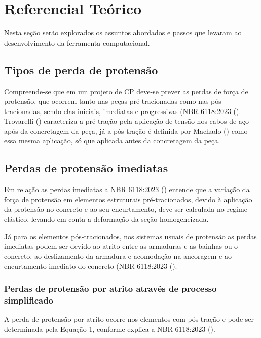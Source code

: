 \section{Referencial Teórico}

\hspace{0.4cm}Nesta seção serão explorados os assuntos abordados e passos que levaram ao desenvolvimento da ferramenta computacional.

\subsection{Tipos de perda de protensão}

\hspace{0.4cm}Compreende-se que em um projeto de CP deve-se prever as perdas de força de protensão, que ocorrem tanto nas peças pré-tracionadas como nas pós-tracionadas, sendo elas iniciais, imediatas e progressivas (NBR 6118:2023 (\citeyear{NOAB}). Trovarelli (\citeyear{TRO}) caracteriza a pré-tração pela 
aplicação de tensão nos cabos de aço após da concretagem da peça, já a pós-tração é definida por Machado (\citeyear{MAC}) como essa mesma aplicação, só que aplicada antes da concretagem da peça.

\subsection{Perdas de protensão imediatas}

\hspace{0.4cm}Em relação as perdas imediatas a NBR 6118:2023 (\citeyear{NOAB}) entende que a variação da força de protensão em elementos estruturais pré-tracionados, devido à aplicação da protensão no concreto e ao seu encurtamento, deve ser calculada no regime elástico, levando em conta a deformação da seção homogeneizada. 

Já para os elementos pós-tracionados, nos sistemas usuais de protensão as perdas imediatas podem ser devido ao atrito entre as armaduras e as bainhas ou o concreto, ao deslizamento da armadura e acomodação na ancoragem e ao encurtamento imediato do concreto (NBR 6118:2023 (\citeyear{NOAB}).

\subsubsection{Perdas de protensão por atrito através de processo simplificado}

\hspace{0.4cm}A perda de protensão por atrito ocorre nos elementos com pós-tração e pode ser determinada pela Equação 1, conforme explica a NBR 6118:2023 (\citeyear{NOAB}).\bigskip

